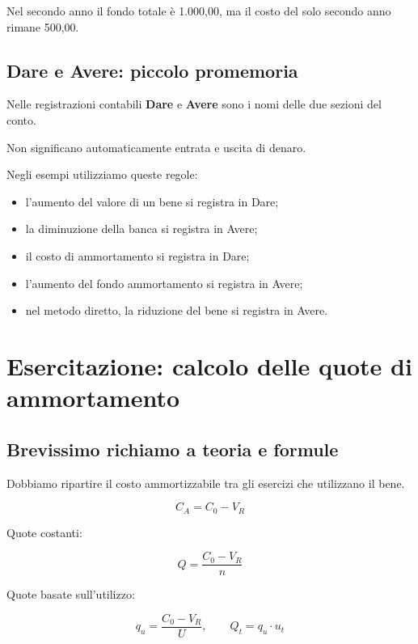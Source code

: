 \noindent Nel secondo anno
il fondo totale è 1.000,00,
ma il costo del solo secondo anno
rimane 500,00.


\subsection{Dare e Avere:
piccolo promemoria}

\noindent Nelle registrazioni contabili
\textbf{Dare} e \textbf{Avere}
sono i nomi delle due sezioni del conto.

\noindent Non significano automaticamente
entrata e uscita di denaro.

\noindent Negli esempi utilizziamo queste regole:

\begin{itemize}
    \item l'aumento del valore di un bene
    si registra in Dare;

    \item la diminuzione della banca
    si registra in Avere;

    \item il costo di ammortamento
    si registra in Dare;

    \item l'aumento del fondo ammortamento
    si registra in Avere;

    \item nel metodo diretto,
    la riduzione del bene
    si registra in Avere.
\end{itemize}


\section{Esercitazione:
calcolo delle quote di ammortamento}

\subsection{Brevissimo richiamo a teoria e formule}

\noindent Dobbiamo ripartire
il costo ammortizzabile
tra gli esercizi che utilizzano il bene.

\[
\boxed{
C_A=C_0-V_R
}
\]

\noindent Quote costanti:

\[
\boxed{
Q=\frac{C_0-V_R}{n}
}
\]

\noindent Quote basate sull'utilizzo:

\[
\boxed{
q_u=\frac{C_0-V_R}{U},
\qquad
Q_t=q_u\cdot u_t
}
\]


